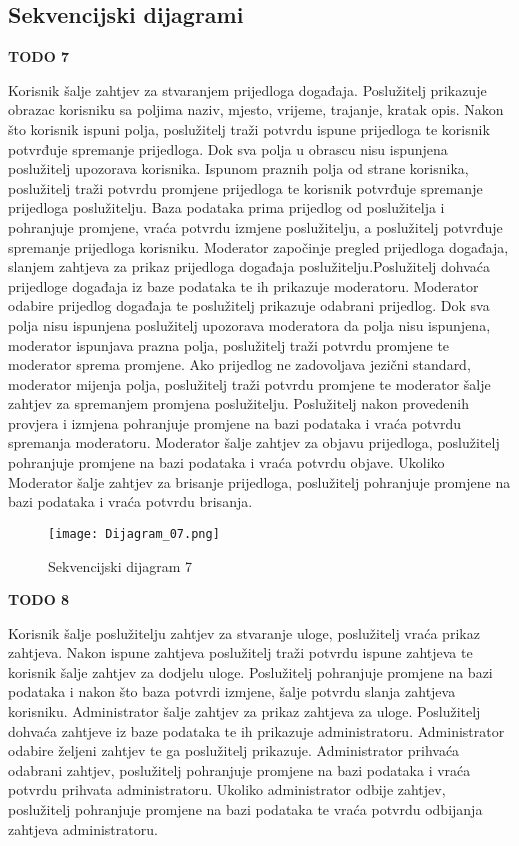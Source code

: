 			\subsection{Sekvencijski dijagrami}
		\noindent \textbf{TODO 7}
			
			
		\noindent Korisnik šalje zahtjev za stvaranjem prijedloga događaja. Poslužitelj prikazuje obrazac korisniku sa poljima naziv, mjesto, vrijeme, trajanje, kratak opis. Nakon što korisnik ispuni polja, poslužitelj traži potvrdu ispune prijedloga te korisnik potvrđuje spremanje prijedloga. Dok sva polja u obrascu nisu ispunjena poslužitelj upozorava korisnika. Ispunom praznih polja od strane korisnika, poslužitelj traži potvrdu promjene prijedloga te korisnik potvrđuje spremanje prijedloga poslužitelju. Baza podataka prima prijedlog od poslužitelja i pohranjuje promjene, vraća potvrdu izmjene poslužitelju, a poslužitelj potvrđuje spremanje prijedloga korisniku. Moderator započinje pregled prijedloga događaja, slanjem zahtjeva za prikaz prijedloga događaja poslužitelju.Poslužitelj dohvaća prijedloge događaja iz baze podataka te ih prikazuje moderatoru. Moderator odabire prijedlog događaja te poslužitelj prikazuje odabrani prijedlog. Dok sva polja nisu ispunjena poslužitelj upozorava moderatora da polja nisu ispunjena, moderator ispunjava prazna polja, poslužitelj traži potvrdu promjene te moderator sprema promjene. Ako prijedlog ne zadovoljava jezični standard, moderator mijenja polja, poslužitelj traži potvrdu promjene te moderator šalje zahtjev za spremanjem promjena poslužitelju. Poslužitelj nakon provedenih provjera i izmjena pohranjuje promjene na bazi podataka i vraća potvrdu spremanja moderatoru. Moderator šalje zahtjev za objavu prijedloga, poslužitelj pohranjuje promjene na bazi podataka i vraća potvrdu objave. Ukoliko Moderator šalje zahtjev za brisanje prijedloga, poslužitelj pohranjuje promjene na bazi podataka i vraća potvrdu
brisanja.  		
				\begin{figure}[H]
					\centering
					\texttt{[image: Dijagram\_07.png]}
					\caption{Sekvencijski dijagram 7}
				\end{figure}	
				\newpage			
		\noindent \textbf{TODO 8}
			
			
		\noindent Korisnik šalje poslužitelju zahtjev za stvaranje uloge, poslužitelj vraća 						prikaz zahtjeva. Nakon ispune zahtjeva poslužitelj traži potvrdu ispune zahtjeva 					te korisnik šalje zahtjev za dodjelu uloge. Poslužitelj pohranjuje 
				promjene na bazi podataka i nakon što baza potvrdi izmjene, 
				šalje potvrdu slanja zahtjeva korisniku. Administrator
				šalje zahtjev za prikaz zahtjeva za uloge. 
				Poslužitelj dohvaća zahtjeve iz baze podataka te ih prikazuje 
				administratoru. Administrator odabire željeni zahtjev te ga poslužitelj 							prikazuje. Administrator prihvaća odabrani
				zahtjev, poslužitelj pohranjuje promjene na bazi podataka i vraća potvrdu 						prihvata administratoru. Ukoliko 
				administrator odbije zahtjev, poslužitelj pohranjuje promjene 
				na bazi podataka te vraća potvrdu odbijanja 
				zahtjeva administratoru.
 

